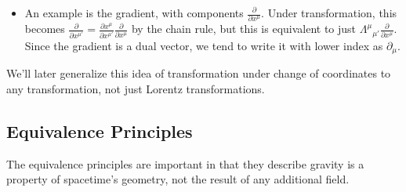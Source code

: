 \documentclass[11pt]{article}
\begin{document}
\begin{itemize}
        \item An example is the gradient, with components \( \frac{\partial }{\partial x^{\mu}} \). Under transformation, this becomes 
        \(\frac{\partial }{\partial x^{\mu'}} = \frac{\partial x^{\mu}}{\partial x^{\mu'}} \frac{\partial }{\partial x^{\mu}} \) by the chain rule, but this is equivalent to just \( \Lambda^{\mu}{}_{\mu'}\frac{\partial}{\partial x^{\mu}} \).
        Since the gradient is a dual vector, we tend to write it with lower index as \( \partial_{\mu} \).

    \end{itemize}
\noindent We'll later generalize this idea of transformation under change of coordinates to any transformation, not just Lorentz transformations.

\subsection{Equivalence Principles}
The equivalence principles are important in that they describe gravity is a property of spacetime's geometry, not the result of any additional field.
\end{document}

